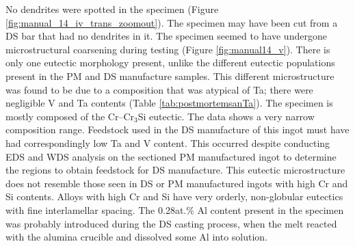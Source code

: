 No dendrites were spotted in the specimen (Figure \ref{fig:manual_14_iv_trans_zoomout}).  The specimen may have been cut from a DS bar that had no dendrites in it.  The specimen seemed to have undergone microstructural coarsening during testing (Figure \ref{fig:manual14_v}).  There is only one eutectic morphology present, unlike the different eutectic populations present in the PM and DS manufacture samples.  This different microstructure was found to be due to a composition that was atypical of Ta; there were negligible V and Ta contents (Table \ref{tab:postmortemsanTa}).  The specimen is mostly composed of the Cr--Cr$_3$Si eutectic.  The data shows a very narrow composition range.  Feedstock used in the DS manufacture of this ingot must have had correspondingly low Ta and V content.  This occurred despite conducting EDS and WDS analysis on the sectioned PM manufactured ingot to determine the regions to obtain feedstock for DS manufacture.  This eutectic microstructure does not resemble those seen in DS or PM manufactured ingots with high Cr and Si contents.  Alloys with high Cr and Si have very orderly, non-globular eutectics with fine interlamellar spacing.  The 0.28at.\% Al content present in the specimen was probably introduced during the DS casting process, when the melt reacted with the alumina crucible and dissolved some Al into solution.
%
